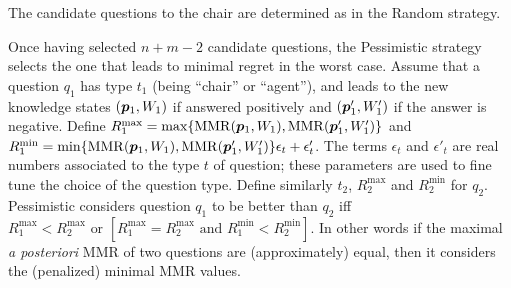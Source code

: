 \documentclass{article}
\begin{document}
The candidate questions to the chair are determined as in the Random strategy.

	Once having selected $n + m - 2$ candidate questions, the Pessimistic strategy selects the one that leads to minimal regret in the worst case.
	Assume that a question $q_1$ has type $t_1$ (being “chair” or “agent”), and leads to the new knowledge states $({\bm{p}}_1, W_1)$ if answered positively and $({\bm{p}}'_1, W'_1)$ if the answer is negative. 
	Define $R^{\max}_1 = \max\{\operatorname{MMR}({\bm{p}}_1, W_1), \operatorname{MMR}({\bm{p}}'_1, W'_1)\}$
	and $R^{\min}_1 = \min\{\operatorname{MMR}({\bm{p}}_1, W_1), \operatorname{MMR}({\bm{p}}'_1, W'_1)\} \epsilon_{t} + \epsilon'_{t}$.
	The terms $\epsilon_t$ and $\epsilon'_{t}$ are real numbers associated to the type $t$ of question; these parameters are used to fine tune the choice of the question type. 
	Define similarly $t_2$, $R^{\max}_2$ and $R^{\min}_2$ for  $q_2$.
	Pessimistic considers question $q_1$ to be better  than $q_2$ iff $R^{\max}_1 < R^{\max}_2 \text{ or } [R^{\max}_1 = R^{\max}_2 \text{ and } R^{\min}_1 < R^{\min}_2]$.
	In other words if the maximal {\em a posteriori} MMR of two questions are (approximately) equal, then it considers the (penalized) minimal MMR values. %
\end{document}

